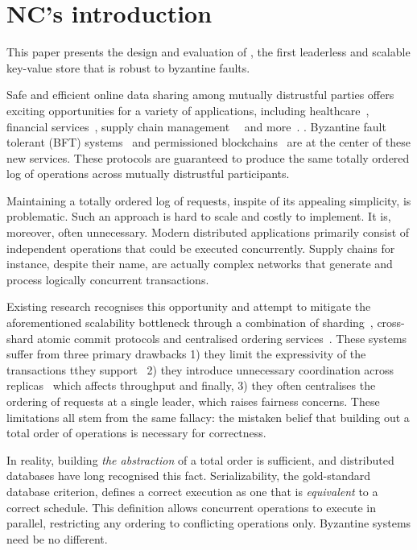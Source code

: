 \section{NC's introduction}

This paper presents the design and evaluation of \sys{}, the
first leaderless and scalable key-value store that is robust
to byzantine faults.

Safe and efficient online data sharing among mutually distrustful
parties offers exciting opportunities for a variety of applications,
including healthcare~\cite{}, financial services~\cite{}, supply chain
management~~\cite{} and more~\cite{}. . Byzantine fault tolerant (BFT)
systems~\cite{} and permissioned blockchains~\cite{}
are at the center of these new services. These protocols are guaranteed to
produce the same totally ordered log of operations across mutually distrustful
participants. 

Maintaining a totally ordered log of requests, inspite of its appealing simplicity, is problematic. Such an approach is hard to scale and costly to implement. It is, moreover, often unnecessary. Modern distributed applications primarily consist of independent operations that could be executed concurrently. Supply chains for instance, despite their name, are actually complex networks that generate and process logically concurrent transactions.

Existing research recognises this opportunity and attempt to mitigate the aforementioned scalability bottleneck through a combination of sharding~\cite{omniledger,chainspace,callinicos}, cross-shard atomic commit protocols and centralised ordering services~\cite{}. These systems suffer from three primary drawbacks 1) they limit the expressivity of the transactions tthey support~\cite{} 2) they introduce unnecessary coordination across replicas~\cite{} which affects throughput and finally, 3) they often centralises the ordering of requests at a single leader, which raises fairness concerns. These limitations all stem from the same fallacy: the mistaken belief that building out a total order of operations is necessary for correctness.
 
In reality, building \textit{the abstraction} of a total order is sufficient, and distributed databases have long recognised this fact. Serializability, the gold-standard database criterion, defines a correct execution as one that is \textit{equivalent} to a correct schedule. This definition allows concurrent operations to execute in parallel, restricting any ordering to conflicting operations only.  Byzantine systems need be no different.

